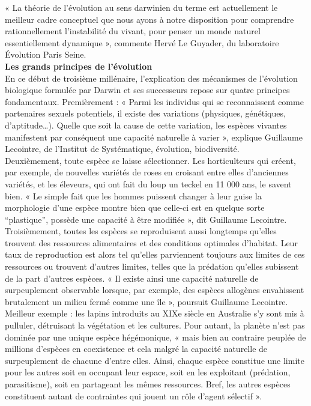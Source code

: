 \documentclass[8pt]{article}
\begin{document}
« La théorie de l’évolution au sens darwinien du terme est actuellement le meilleur cadre conceptuel que nous ayons à notre disposition pour comprendre rationnellement l’instabilité du vivant, pour penser un monde naturel essentiellement dynamique », commente Hervé Le Guyader, du laboratoire Évolution Paris Seine.\\

\textbf{Les grands principes de l’évolution}\\

En ce début de troisième millénaire, l’explication des mécanismes de l’évolution biologique formulée par Darwin et ses successeurs repose sur quatre principes fondamentaux. Premièrement : « Parmi les individus qui se reconnaissent comme partenaires sexuels potentiels, il existe des variations (physiques, génétiques, d’aptitude…). Quelle que soit la cause de cette variation, les espèces vivantes manifestent par conséquent une capacité naturelle à varier », explique Guillaume Lecointre, de l’Institut de Systématique, évolution, biodiversité.\\

Deuxièmement, toute espèce se laisse sélectionner. Les horticulteurs qui créent, par exemple, de nouvelles variétés de roses en croisant entre elles d’anciennes variétés, et les éleveurs, qui ont fait du loup un teckel en 11 000 ans, le savent bien. « Le simple fait que les hommes puissent changer à leur guise la morphologie d’une espèce montre bien que celle-ci est en quelque sorte “plastique”, possède une capacité à être modifiée », dit Guillaume Lecointre.\\

Troisièmement, toutes les espèces se reproduisent aussi longtemps qu’elles trouvent des ressources alimentaires et des conditions optimales d’habitat. Leur taux de reproduction est alors tel qu’elles parviennent toujours aux limites de ces ressources ou trouvent d’autres limites, telles que la prédation qu’elles subissent de la part d’autres espèces. « Il existe ainsi une capacité naturelle de surpeuplement observable lorsque, par exemple, des espèces allogènes envahissent brutalement un milieu fermé comme une île », poursuit Guillaume Lecointre. Meilleur exemple : les lapins introduits au XIXe siècle en Australie s’y sont mis à pulluler, détruisant la végétation et les cultures. Pour autant, la planète n’est pas dominée par une unique espèce hégémonique, « mais bien au contraire peuplée de millions d’espèces en coexistence et cela malgré la capacité naturelle de surpeuplement de chacune d’entre elles. Ainsi, chaque espèce constitue une limite pour les autres soit en occupant leur espace, soit en les exploitant (prédation, parasitisme), soit en partageant les mêmes ressources. Bref, les autres espèces constituent autant de contraintes qui jouent un rôle d’agent sélectif ».\\ 
\end{document}
